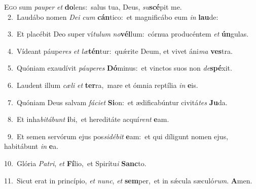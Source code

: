 \lettrine{\initial\textcolor{\initialcolor}{E}}{go} sum \textit{pau}\-\textit{per} \textit{et} \textbf{do}\-lens:~\star salus tua, Deus, \textit{su}\-\textbf{scé}pit me.\\
{\numbfont\textcolor{\numbcolor}{~2.}}~Laudábo nomen \textit{De}\-\textit{i} \textit{cum} \textbf{cán}\-tico:~\star et magnificábo eum \textit{in} \textbf{lau}\-de:\par
{\numbfont\textcolor{\numbcolor}{~3.}}~Et placébit Deo super ví\-\textit{tu}\-\textit{lum} \textit{no}\-\textbf{vél}lum:~\star córnua producéntem \textit{et} \textbf{ún}\-gulas.\par
{\numbfont\textcolor{\numbcolor}{~4.}}~Vídeant páupe\textit{res} \textit{et} \textit{læ}\-\textbf{tén}tur:~\star quǽrite Deum, et vivet áni\textit{ma} \textbf{ves}\-tra.\par
{\numbfont\textcolor{\numbcolor}{~5.}}~Quóniam exaudívit \textit{páu}\-\textit{pe}\textit{res} \textbf{Dó}\-minus:~\star et vinctos suos non \textit{de}\-\textbf{spé}xit.\par
{\numbfont\textcolor{\numbcolor}{~6.}}~Laudent illum \textit{cæ}\-\textit{li} \textit{et} \textbf{ter}\-ra,~\star mare et ómnia reptília \textit{in} \textbf{e}\-is.\par
{\numbfont\textcolor{\numbcolor}{~7.}}~Quóniam Deus salvam \textit{fá}\-\textit{ci}\textit{et} \textbf{Si}\-on:~\star et ædificabúntur civitá\textit{tes} \textbf{Ju}\-da.\par
{\numbfont\textcolor{\numbcolor}{~8.}}~Et inha\-\textit{bi}\-\textit{tá}\textit{bunt} \textbf{i}\-bi,~\star et hereditáte acquí\textit{rent} \textbf{e}\-am.\par
{\numbfont\textcolor{\numbcolor}{~9.}}~Et semen servórum ejus pos\-\textit{si}\-\textit{dé}\textit{bit} \textbf{e}\-am:~\star et qui díligunt nomen ejus, habitábunt \textit{in} \textbf{e}\-a.\par
{\numbfont\textcolor{\numbcolor}{10.}}~Glória \textit{Pa}\-\textit{tri}, \textit{et} \textbf{Fí}\-lio,~\star et Spirítu\textit{i} \textbf{Sanc}\-to.\par
{\numbfont\textcolor{\numbcolor}{11.}}~Sicut erat in princípio, \textit{et} \textit{nunc}\-, \textit{et} \textbf{sem}\-per,~\star et in sǽcula sæculó\-\textit{rum}\-. \textbf{A}\-men.\par
